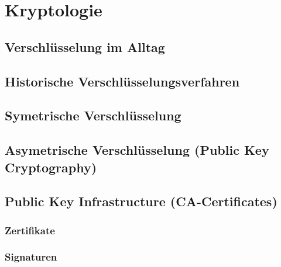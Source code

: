 \section{Kryptologie}
\subsection{Verschlüsselung im Alltag}
\subsection{Historische Verschlüsselungsverfahren}
\subsection{Symetrische Verschlüsselung}
\subsection{Asymetrische Verschlüsselung (Public Key Cryptography)}
\subsection{Public Key Infrastructure (CA-Certificates)}
\subsubsection{Zertifikate}
\subsubsection{Signaturen}